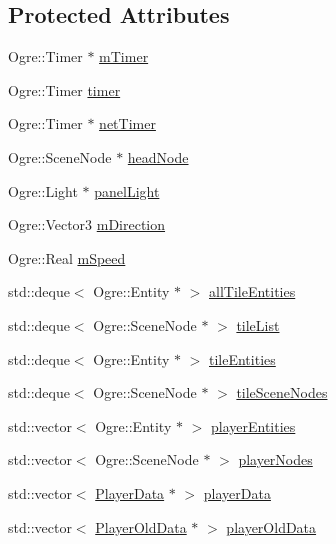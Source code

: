 \subsection*{Protected Attributes}
\begin{DoxyCompactItemize}
\item 
Ogre\-::\-Timer $\ast$ \hyperlink{classTileGame_a51e31f23bb041d24e36d0cacac89bfef}{m\-Timer}
\item 
Ogre\-::\-Timer \hyperlink{classTileGame_adbfc142c4bd14007f4aec65b164bbea7}{timer}
\item 
Ogre\-::\-Timer $\ast$ \hyperlink{classTileGame_a0193bc10ab8efe7cbf37ec7d41378b55}{net\-Timer}
\item 
Ogre\-::\-Scene\-Node $\ast$ \hyperlink{classTileGame_abea2ef2d450d7813d7faab4f8a3a8af6}{head\-Node}
\item 
Ogre\-::\-Light $\ast$ \hyperlink{classTileGame_a23db72b0263e4d5595c1f170cc312185}{panel\-Light}
\item 
Ogre\-::\-Vector3 \hyperlink{classTileGame_a3ce67ed5bc51aa139c087e1bdd5b7fe0}{m\-Direction}
\item 
Ogre\-::\-Real \hyperlink{classTileGame_a247769c14e679af78f5d877510e3b7ca}{m\-Speed}
\item 
std\-::deque$<$ Ogre\-::\-Entity $\ast$ $>$ \hyperlink{classTileGame_a0308b658e89712b0dfbe5998495f9cec}{all\-Tile\-Entities}
\item 
std\-::deque$<$ Ogre\-::\-Scene\-Node $\ast$ $>$ \hyperlink{classTileGame_ad9bec31020eaa7dc719d8e9b8af20ee2}{tile\-List}
\item 
std\-::deque$<$ Ogre\-::\-Entity $\ast$ $>$ \hyperlink{classTileGame_aad2a30c885c91193d0a6da18f1477de5}{tile\-Entities}
\item 
std\-::deque$<$ Ogre\-::\-Scene\-Node $\ast$ $>$ \hyperlink{classTileGame_ac8b228c7849cb924a099f94de266c42d}{tile\-Scene\-Nodes}
\item 
std\-::vector$<$ Ogre\-::\-Entity $\ast$ $>$ \hyperlink{classTileGame_a30a9864bb733707d17c15b2c09a6245a}{player\-Entities}
\item 
std\-::vector$<$ Ogre\-::\-Scene\-Node $\ast$ $>$ \hyperlink{classTileGame_ab261f06fa3d89f8af2223ffe1a56337a}{player\-Nodes}
\item 
std\-::vector$<$ \hyperlink{structPlayerData}{Player\-Data} $\ast$ $>$ \hyperlink{classTileGame_adc02f822e33b2d8a77693301d050bb91}{player\-Data}
\item 
std\-::vector$<$ \hyperlink{structPlayerOldData}{Player\-Old\-Data} $\ast$ $>$ \hyperlink{classTileGame_a0a931a016e78d8aaaa5eb7543565bd31}{player\-Old\-Data}

\end{DoxyCompactItemize}
